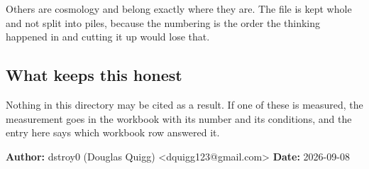 Others are cosmology and belong exactly where they are. The file is kept whole and not split into piles, because the numbering is the order the thinking happened in and cutting it up would lose that.

\subsection{What keeps this honest}

Nothing in this directory may be cited as a result. If one of these is measured, the measurement goes in the workbook with its number and its conditions, and the entry here says which workbook row answered it.

\textbf{Author:} dstroy0 (Douglas Quigg) <dquigg123@gmail.com> \textbf{Date:} 2026-09-08

